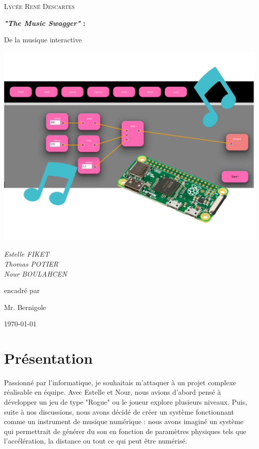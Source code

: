 \documentclass[12pt]{article}
\begin{document}
	\begin{titlepage}
		\centering
		{\scshape\LARGE Lycée René Descartes \par}
		\vspace{1cm}
		{\huge\bfseries \textit{"The Music Swagger"} :\par De la musique interactive\par}
		\includegraphics[height=10cm]{presentation_image}
		
		{\Large\itshape Estelle FIKET\\Thomas POTIER\\Nour BOULAHCEN\par}
		\vfill
		encadré par\par
		Mr. Bernigole
		
		\vfill
		
		{\large \today\par}
	\end{titlepage}
	\tableofcontents
	\newpage
	\section{Présentation}
	\paragraph{}
	Passionné par l'informatique, je souhaitais m'attaquer à un projet complexe réalisable en équipe. Avec Estelle et Nour, nous avions d'abord pensé à développer un jeu de type "Rogue" ou le joueur explore plusieurs niveaux. Puis, suite à nos discussions, nous avons décidé de créer un système fonctionnant comme un instrument de musique numérique : nous avons imaginé un système qui permettrait de générer du son en fonction de paramètres physiques tels que l'accélération, la distance ou tout ce qui peut être numérisé.
\end{document}

